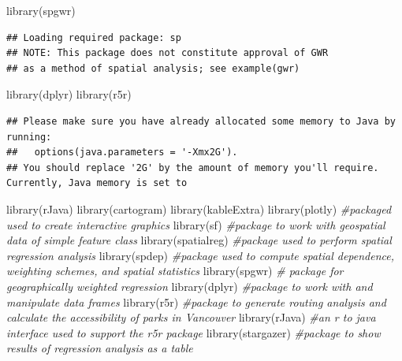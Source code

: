 \documentclass[
]{article}
\newenvironment{Shaded}{\begin{snugshade}}{\end{snugshade}}
\newcommand{\CommentTok}[1]{\textcolor[rgb]{0.56,0.35,0.01}{\textit{#1}}}
\newcommand{\FunctionTok}[1]{\textcolor[rgb]{0.00,0.00,0.00}{#1}}
\newcommand{\NormalTok}[1]{#1}
\begin{document}
\begin{Shaded}
\begin{Highlighting}[]
\FunctionTok{library}\NormalTok{(spgwr)}
\end{Highlighting}
\end{Shaded}

\begin{verbatim}
## Loading required package: sp
## NOTE: This package does not constitute approval of GWR
## as a method of spatial analysis; see example(gwr)
\end{verbatim}

\begin{Shaded}
\begin{Highlighting}[]
\FunctionTok{library}\NormalTok{(dplyr)}
\FunctionTok{library}\NormalTok{(r5r)}
\end{Highlighting}
\end{Shaded}

\begin{verbatim}
## Please make sure you have already allocated some memory to Java by running:
##   options(java.parameters = '-Xmx2G').
## You should replace '2G' by the amount of memory you'll require. Currently, Java memory is set to
\end{verbatim}

\begin{Shaded}
\begin{Highlighting}[]
\FunctionTok{library}\NormalTok{(rJava)}
\FunctionTok{library}\NormalTok{(cartogram)}
\FunctionTok{library}\NormalTok{(kableExtra) }
\FunctionTok{library}\NormalTok{(plotly) }\CommentTok{\#packaged used to create interactive graphics }
\FunctionTok{library}\NormalTok{(sf) }\CommentTok{\#package to work with geospatial data of simple feature class}
\FunctionTok{library}\NormalTok{(spatialreg) }\CommentTok{\#package used to perform spatial regression analysis}
\FunctionTok{library}\NormalTok{(spdep) }\CommentTok{\#package used to compute spatial dependence, weighting schemes, and spatial statistics}
\FunctionTok{library}\NormalTok{(spgwr) }\CommentTok{\# package for geographically weighted regression }
\FunctionTok{library}\NormalTok{(dplyr) }\CommentTok{\#package to work with and manipulate data frames}
\FunctionTok{library}\NormalTok{(r5r) }\CommentTok{\#package to generate routing analysis and calculate the accessibility of parks in Vancouver}
\FunctionTok{library}\NormalTok{(rJava) }\CommentTok{\#an r to java interface used to support the r5r package }
\FunctionTok{library}\NormalTok{(stargazer) }\CommentTok{\#package to show results of regression analysis as a table}
\end{Highlighting}
\end{Shaded}
\end{document}

